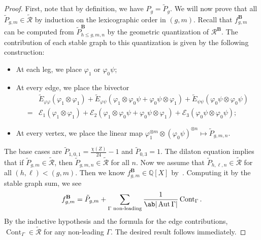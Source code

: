 \documentclass[10pt]{amsart}
\theoremstyle{definition}
\theoremstyle{remark}
\theoremstyle{plain}
\theoremstyle{definition}
\theoremstyle{remark}
\newcommand{\Q}{\mathbb{Q}}
\newcommand{\bB}{\mathbf{B}}
\newcommand{\msc}[1]{\mathscr{#1}}
\newcommand{\on}[1]{\operatorname{#1}}
\newcommand{\1}{\mathbf{1}}
\newcommand{\2}{\mathbf{2}}
\newcommand{\3}{\mathbf{3}}
\DeclareMathOperator{\Aut}{Aut}
\numberwithin{equation}{section}
\begin{document}
\begin{proof}
    First, note that by definition, we have $P_g = \tilde{P}_g$. We will now prove that all $\tilde{P}_{g,m} \in \tilde{\msc{R}}$ by induction on the lexicographic order in $(g,m)$. Recall that $f_{g,m}^{\bB}$ can be computed from $\tilde{P}^{\bB}_{h \leq g,m,n}$ by the geometric quantization of $\msc{R}^{\bB}$. The contribution of each stable graph to this quantization is given by the following construction:
    \begin{itemize}
        \item At each leg, we place $\varphi_1$ or $\varphi_0 \psi$;
        \item At every edge, we place the bivector
            \begin{align*}
                &\tilde{E}_{\varphi\varphi} (\varphi_1 \otimes \varphi_1) + \tilde{E}_{\varphi\psi}(\varphi_1 \otimes \varphi_0 \psi + \varphi_0 \psi \otimes \varphi_1) + \tilde{E}_{\psi\psi}(\varphi_0\psi \otimes \varphi_0\psi) \\
                =&\msc{E}_1 (\varphi_1 \otimes \varphi_1) + \msc{E}_2(\varphi_1 \otimes \varphi_0 \psi + \varphi_0 \psi \otimes \varphi_1) + \msc{E}_3(\varphi_0\psi \otimes \varphi_0\psi);
            \end{align*}
         \item At every vertex, we place the linear map $\varphi_1^{\otimes m} \otimes (\varphi_0\psi)^{\otimes n} \mapsto \tilde{P}_{g,m,n}$.
    \end{itemize}
    
    The base cases are $\tilde{P}_{1,0,1} = \frac{\chi(Z)}{24}-1$ and $\tilde{P}_{0,3} = 1$. The dilaton equation implies that if $\tilde{P}_{g,m} \in \tilde{\msc{R}}$, then $\tilde{P}_{g,m,n} \in \tilde{\msc{R}}$ for all $n$. Now we assume that $\tilde{P}_{h,\ell,n} \in \tilde{\msc{R}}$ for all $(h,\ell) < (g,m)$. Then we know $f_{g,m}^{\bB} \in \Q[X]$ by~. Computing it by the stable graph sum, we see
    \[ f_{g,m}^{\bB} = \tilde{P}_{g,m} + \sum_{\Gamma \text{ non-leading}} \frac{1}{\ab|\Aut \Gamma|} \on{Cont}_{\Gamma}. \]
    By the inductive hypothesis and the formula for the edge contributions, $\on{Cont}_{\Gamma} \in \tilde{\msc{R}}$ for any non-leading $\Gamma$. The desired result follows immediately.
\end{proof}
\end{document}
